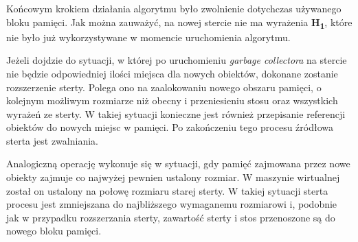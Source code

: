 Końcowym krokiem działania algorytmu było zwolnienie dotychczas używanego bloku pamięci. Jak można zauważyć, na nowej stercie nie ma wyrażenia \textbf{H\textsubscript{1}}, które nie było już wykorzystywane w momencie uruchomienia algorytmu.

Jeżeli dojdzie do sytuacji, w której po uruchomieniu \emph{garbage collectora} na stercie nie będzie odpowiedniej ilości miejsca dla nowych obiektów, dokonane zostanie rozszerzenie sterty. Polega ono na zaalokowaniu nowego obszaru pamięci, o kolejnym możliwym rozmiarze niż obecny i przeniesieniu stosu oraz wszystkich wyrażeń ze sterty.
W takiej sytuacji konieczne jest również przepisanie referencji obiektów do nowych miejsc w pamięci.
Po zakończeniu tego procesu źródłowa sterta jest zwalniania.

Analogiczną operację wykonuje się w sytuacji, gdy pamięć zajmowana przez nowe obiekty zajmuje co najwyżej pewnien ustalony rozmiar.
W maszynie wirtualnej został on ustalony na połowę rozmiaru starej sterty.
W takiej sytuacji sterta procesu jest zmniejszana do najbliższego wymaganemu rozmiarowi i, podobnie jak w przypadku rozszerzania sterty, zawartość sterty i stos przenoszone są do nowego bloku pamięci.

